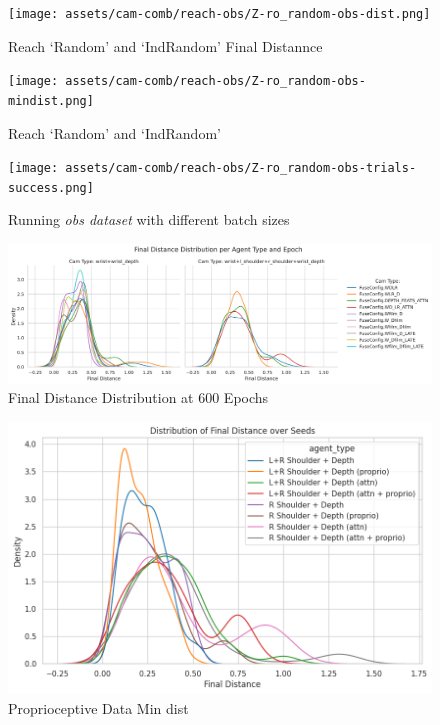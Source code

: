   \begin{figure}[htpb]
    \centering
    \texttt{[image: assets/cam-comb/reach-obs/Z-ro\_random-obs-dist.png]}
    \caption{Reach `Random' and `IndRandom' Final Distannce}
  \end{figure}

  \begin{figure}[htpb]
    \centering
    \texttt{[image: assets/cam-comb/reach-obs/Z-ro\_random-obs-mindist.png]}
    \caption{Reach `Random' and `IndRandom'}
  \end{figure}

  \begin{figure}[htpb]
    \centering
    \texttt{[image: assets/cam-comb/reach-obs/Z-ro\_random-obs-trials-success.png]}
    \caption{Running \emph{obs dataset} with different batch sizes}\label{apx:Z-ro_random-obs-trials-success}
  \end{figure}
  
  \begin{figure}[htpb]
    \centering
    \includegraphics[width=0.8\linewidth]{assets/evaluation/rnn/600-cams.png}
    \caption{Final Distance Distribution at 600 Epochs}\label{fig:rnn-fusing-600}
\end{figure}

  \begin{figure}[htpb]
    \centering
    \includegraphics[scale=0.6]{assets/evaluation/proprio/proprio-final-ls.png}
    \caption{Proprioceptive Data Min dist}\label{apx:Z-proprio-dist-lr}
  \end{figure}
  
